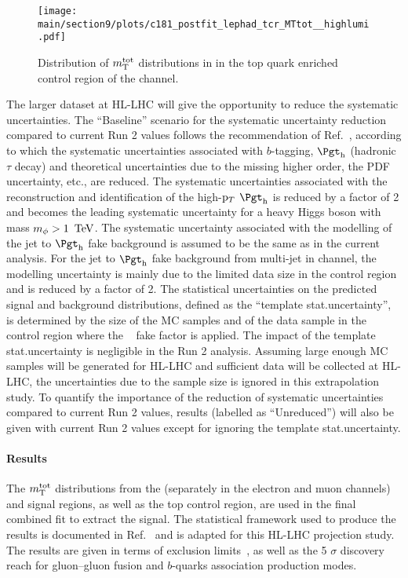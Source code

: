 \begin{figure}[!ht]
    \centering
        \qquad
        \texttt{[image: \\main/section9/plots/c181\_postfit\_lephad\_tcr\_MTtot\_\_highlumi.pdf]}
        \caption{Distribution of $m_\textnormal{T}^\textnormal{tot}$ distributions in in the top quark enriched control region of the \lephad channel.}
    \label{fig:mTtotDistributionsCR}
\end{figure}

The larger dataset at HL-LHC will give the opportunity to reduce the systematic uncertainties.
The ``Baseline'' scenario for the systematic uncertainty reduction compared to current Run 2 values follows
the recommendation of Ref.~\cite{LHATLASdetectorSystScale}, according to which the systematic uncertainties
associated with $b$-tagging, $\tauhad$ (hadronic $\tau$ decay) and theoretical uncertainties
due to the missing higher order,
the PDF uncertainty, etc., are reduced. The systematic uncertainties associated with the reconstruction
and identification of the high-$\mathrm{p}_{T}$ $\tauhad$ is reduced by a factor of 2 and becomes the leading systematic
uncertainty for a heavy Higgs boson with mass $m_{\phi} > 1~\,\text{Te\hspace{-.08em}V}$. The systematic uncertainty associated
with the modelling of the jet to $\tauhad$ fake background is assumed to be the same as in the current analysis.
For the jet to $\tauhad$ fake background from multi-jet in \hadhad channel, the modelling uncertainty is mainly
due to the limited data size in the control region and is reduced by a factor of 2. The statistical uncertainties
on the predicted signal and background distributions, defined as the ``template stat.\@ uncertainty'', is determined
by the size of the MC samples and of the data sample in the control region where the \tauhad~ fake factor is applied.
The impact of the template stat.\@ uncertainty is negligible in the Run 2 analysis. Assuming large enough MC
samples will be generated for HL-LHC and sufficient data will be collected at HL-LHC, the uncertainties due to
the sample size is ignored in this extrapolation study.
To quantify the importance of the reduction of systematic uncertainties compared to current Run 2 values,
results (labelled as ``Unreduced'') will also be given with current Run 2 values
except for ignoring the template stat.\@ uncertainty.

\paragraph{Results}
\label{sec:result}
The $m_\textnormal{T}^\textnormal{tot}$ distributions from the \lephad(separately in the electron and muon channels) and \hadhad signal regions, as well as the top control region, are used in the final combined fit to extract the signal. The statistical framework used to produce the \RunTwo results is documented in Ref.~\cite{ATLASRun2Ditau} and is adapted for this HL-LHC projection study. The results are given in terms of exclusion limits~\cite{CLs_2002}, as well as the 5 $\sigma$ discovery reach for gluon--gluon fusion and $b$-quarks association production modes.

